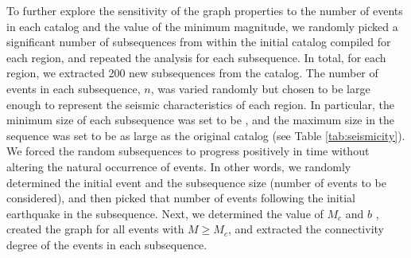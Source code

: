 To further explore the sensitivity of the graph properties to the number of events in each catalog and the value of the minimum magnitude, we randomly picked a significant number of subsequences from within the initial catalog compiled for each region, and repeated the analysis for each subsequence. In total, for each region, we extracted 200 new subsequences from the  catalog. The number of events in each subsequence, $n$, was varied randomly but chosen to be large enough to represent the seismic characteristics of each region. In particular, the minimum size of each subsequence was set to be , and the maximum size in the sequence was set to be as large as the original  catalog (see Table \ref{tab:seismicity}). We forced the random subsequences to progress positively in time without altering the natural occurrence of events. In other words, we randomly determined the initial event and the subsequence size (number of events to be considered), and then picked that number of events following the initial earthquake in the subsequence. Next, we determined the value of $M_c$ and $b$ , created the graph for all events with $M \geq M_c$, and extracted the connectivity degree of the events in each subsequence. 

